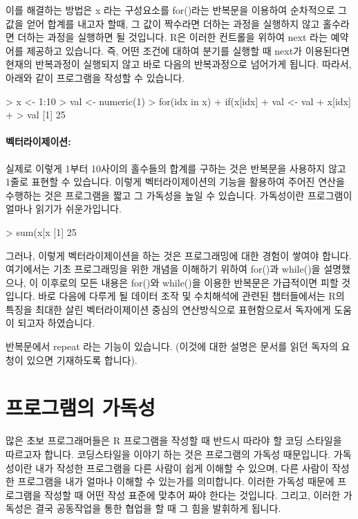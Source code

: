 이를 해결하는 방법은 x 라는 구성요소를 for()라는 반복문을 이용하여 순차적으로 그 값을 얻어 합계를 내고자 할때, 그 값이 짝수라면 더하는 과정을 실행하지 않고 홀수라면 더하는 과정을 실행하면 될 것입니다.
R은 이러한 컨트롤을 위하여 next 라는 예약어를 제공하고 있습니다.
즉, 어떤 조건에 대하여 분기를 실행할 때 next가 이용된다면 현재의 반복과정이 실행되지 않고 바로 다음의 반복과정으로 넘어가게 됩니다. 
따라서, 아래와 같이 프로그램을 작성할 수 있습니다. 

\begin{Schunk}
\begin{Soutput}
> x <- 1:10
> val <- numeric(1)
> for(idx in x){
+ if(x[idx] %% 2 == 0) next
+ val <- val + x[idx]
+ }
> val
[1] 25
\end{Soutput}
\end{Schunk}

\paragraph{벡터라이제이션: }

실제로 이렇게 1부터 10사이의 홀수들의 합계를 구하는 것은 반복문을 사용하지 않고 1줄로 표현할 수 있습니다.
이렇게 벡터라이제이션의 기능을 활용하여 주어진 연산을 수행하는 것은 프로그램을 짧고 그 가독성을 높일 수 있습니다. 
가독성이란 프로그램이 얼마나 읽기가 쉬운가입니다.

\begin{Schunk}
\begin{Soutput}
> sum(x[x %% 2 != 0])
[1] 25
\end{Soutput}
\end{Schunk}

그러나, 이렇게 벡터라이제이션을 하는 것은 프로그래밍에 대한 경험이 쌓여야 합니다. 
여기에서는 기초 프로그래밍을 위한 개념을 이해하기 위하여 for()과 while()을 설명했으나, 이 이후로의 모든 내용은 for()와 while()을 이용한 반복문은 가급적이면 피할 것입니다.
바로 다음에 다루게 될 데이터 조작 및 수치해석에 관련된 챕터들에서는 R의 특징을 최대한 살린 벡터라이제이션 중심의 연산방식으로 표현함으로서 독자에게 도움이 되고자 하였습니다.

반복문에서 repeat 라는 기능이 있습니다. (이것에 대한 설명은 문서를 읽던 독자의 요청이 있으면 기재하도록 합니다).

\section{프로그램의 가독성}

많은 초보 프로그래머들은 R 프로그램을 작성할 때 반드시 따라야 할 코딩 스타일을 따르고자 합니다.
코딩스타일을 이야기 하는 것은 프로그램의 가독성 때문입니다. 
가독성이란 내가 작성한 프로그램을 다른 사람이 쉽게 이해할 수 있으며, 다른 사람이 작성한 프로그램을 내가 얼마나 이해할 수 있는가를 의미합니다.
이러한 가독성 때문에 프로그램을 작성할 때 어떤 작성 표준에 맞추어 짜야 한다는 것입니다.
그리고, 이러한 가독성은 결국 공동작업을 통한 협업을 할 때 그 힘을 발휘하게 됩니다. 

